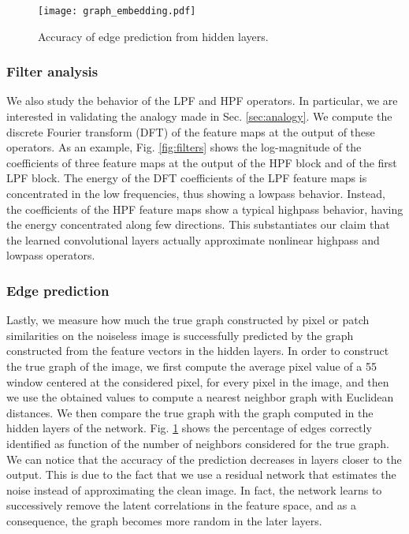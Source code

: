 \documentclass[journal]{IEEEtran}
\begin{document}
\begin{figure}
\centering
\texttt{[image: graph\_embedding.pdf]}
\caption{Accuracy of edge prediction from hidden layers.}
\label{fig:graph_embedding}
\end{figure}

\subsubsection{Filter analysis}
We also study the behavior of the LPF and HPF operators. In particular, we are interested in validating the analogy made in Sec. \ref{sec:analogy}. We compute the discrete Fourier transform (DFT) of the feature maps at the output of these operators. As an example, Fig. \ref{fig:filters} shows the log-magnitude of the coefficients of three feature maps at the output of the HPF block and of the first LPF block. The energy of the DFT coefficients of the LPF feature maps is concentrated in the low frequencies, thus showing a lowpass behavior. Instead, the coefficients of the HPF feature maps show a typical highpass behavior, having the energy concentrated along few directions.
This substantiates our claim that the learned convolutional layers actually approximate nonlinear highpass and lowpass operators.

\subsubsection{Edge prediction}
Lastly, we measure how much the true graph constructed by pixel or patch similarities on the noiseless image is successfully predicted by the graph constructed from the feature vectors in the hidden layers. In order to construct the true graph of the image, we first compute the average pixel value of a 55 window centered at the considered pixel, for every pixel in the image, and then we use the obtained values to compute a nearest neighbor graph with Euclidean distances. We then compare the true graph with the graph computed in the hidden layers of the network. Fig. \ref{fig:graph_embedding} shows the percentage of edges correctly identified as function of the number of neighbors considered for the true graph. We can notice that the accuracy of the prediction decreases in layers closer to the output. This is due to the fact that we use a residual network that estimates the noise instead of approximating the clean image. In fact, the network learns to successively remove the latent correlations in the feature space, and as a consequence, the graph becomes more random in the later layers.
\end{document}

